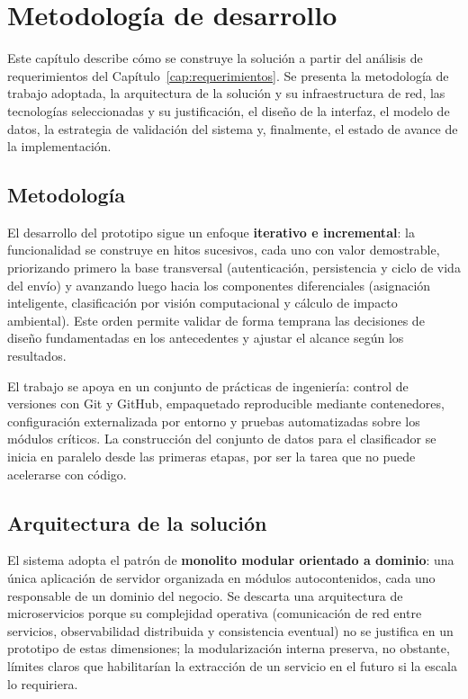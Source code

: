 {\color{nuevo}%
\chapter{Metodología de desarrollo}
\label{cap:diseno}

Este capítulo describe cómo se construye la solución a partir del análisis de requerimientos del Capítulo~\ref{cap:requerimientos}. Se presenta la metodología de trabajo adoptada, la arquitectura de la solución y su infraestructura de red, las tecnologías seleccionadas y su justificación, el diseño de la interfaz, el modelo de datos, la estrategia de validación del sistema y, finalmente, el estado de avance de la implementación.

\section{Metodología}

El desarrollo del prototipo sigue un enfoque \textbf{iterativo e incremental}: la funcionalidad se construye en hitos sucesivos, cada uno con valor demostrable, priorizando primero la base transversal (autenticación, persistencia y ciclo de vida del envío) y avanzando luego hacia los componentes diferenciales (asignación inteligente, clasificación por visión computacional y cálculo de impacto ambiental). Este orden permite validar de forma temprana las decisiones de diseño fundamentadas en los antecedentes y ajustar el alcance según los resultados.

El trabajo se apoya en un conjunto de prácticas de ingeniería: control de versiones con Git y GitHub, empaquetado reproducible mediante contenedores, configuración externalizada por entorno y pruebas automatizadas sobre los módulos críticos. La construcción del conjunto de datos para el clasificador se inicia en paralelo desde las primeras etapas, por ser la tarea que no puede acelerarse con código.

\section{Arquitectura de la solución}

El sistema adopta el patrón de \textbf{monolito modular orientado a dominio}: una única aplicación de servidor organizada en módulos autocontenidos, cada uno responsable de un dominio del negocio. Se descarta una arquitectura de microservicios porque su complejidad operativa (comunicación de red entre servicios, observabilidad distribuida y consistencia eventual) no se justifica en un prototipo de estas dimensiones; la modularización interna preserva, no obstante, límites claros que habilitarían la extracción de un servicio en el futuro si la escala lo requiriera.

}
